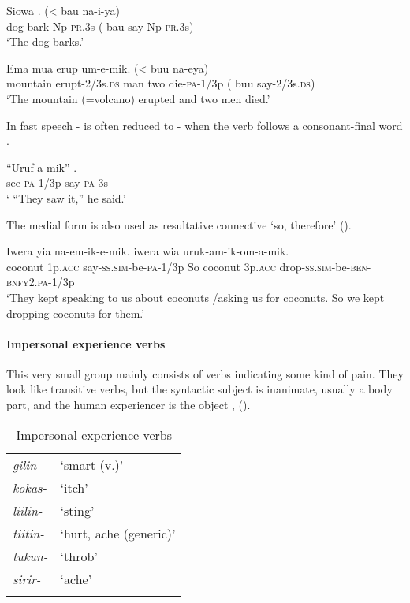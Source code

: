 \ea%
\label{ex:3:x331}
\gll Siowa . ({{\textless}} bau na-i-ya) \\
dog bark-Np-\textsc{pr}.3s ( bau say-Np-\textsc{pr}.3s)\\
\glt`The dog barks.'
\z

\ea%
\label{ex:3:x332}
\gll Ema  mua erup um-e-mik. ({{\textless}} buu na-eya) \\
mountain erupt-2/3s.\textsc{ds} man two die-\textsc{pa}-1/3p ( buu say-2/3s.\textsc{ds})\\
\glt`The mountain (=volcano) erupted and two men died.'
\z

In fast speech - is often reduced to - when the verb follows a consonant-final word .

\ea%
\label{ex:3:x333}
\gll ``Uruf-a-mik'' . \\
see-\textsc{pa}-1/3p say-\textsc{pa}-3s \\
\glt` ``They saw it,'' he said.'
\z

The medial form  is also used as resultative connective `so, therefore'   ().

\ea%
\label{ex:3:x500}
\gll Iwera yia na-em-ik-e-mik.  iwera wia uruk-am-ik-om-a-mik. \\
coconut 1p.\textsc{acc} say-\textsc{ss}.\textsc{sim}-be-\textsc{pa}-1/3p So coconut 3p.\textsc{acc} drop-\textsc{ss}.\textsc{sim}-be-\textsc{ben}-\textsc{bnfy}2.\textsc{pa}-1/3p\\
\glt`They kept speaking to us about coconuts /asking us for coconuts. So we kept dropping coconuts for them.'
\z

\paragraph{Impersonal experience verbs}\label{sec:3.8.4.4.7}
{}
This very small group mainly consists of verbs indicating some kind of pain. They look like transitive verbs, but the syntactic subject is inanimate, usually a body part, and the human experiencer is the object ,  (). 

\begin{table}
\caption{Impersonal experience verbs}
\label{tab:3:impersonalexperience}
 
\begin{tabular}{>{\itshape}ll}
\mytoprule
gilin- &`smart (v.)'\\
kokas- &`itch'\\
liilin- &`sting'\\
tiitin- &`hurt, ache (generic)'\\
tukun- &`throb'\\
sirir- &`ache'\\
\mybottomrule
\end{tabular}

\end{table}

